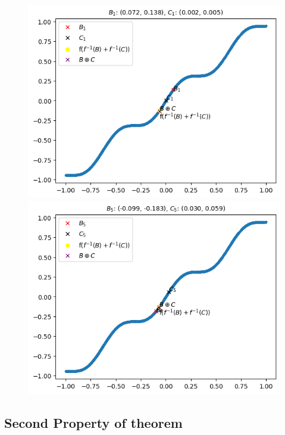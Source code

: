 \documentclass{article}
\begin{document}
            \begin{figure}[h]
                \centering
                \begin{minipage}{0.5\textwidth}
                    \centering
                    \includegraphics[width=0.9\linewidth]{./images/3.png}
                \end{minipage}%
                \begin{minipage}{0.5\textwidth}
                    \centering
                    \includegraphics[width=0.9\linewidth]{./images/4.png}
                \end{minipage}
            \end{figure}
            \newpage
    \subsection{Second Property of theorem}
\end{document}
